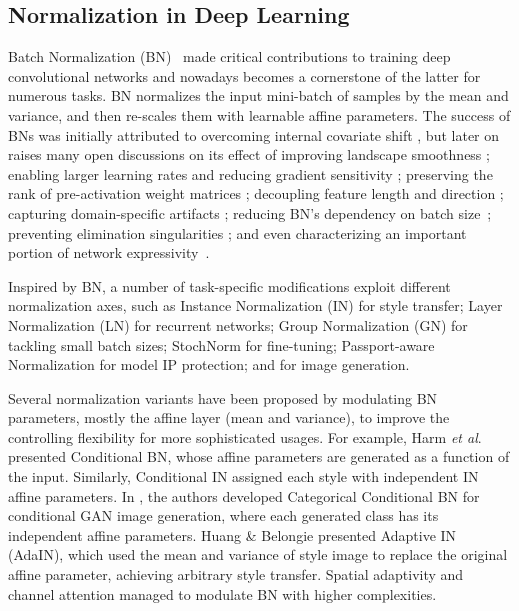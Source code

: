 \documentclass{article}
\newcommand{\etal}{\textit{et al}.}
\begin{document}
\subsection{Normalization in Deep Learning}
 Batch Normalization (BN)~\citep{ioffe2015batch} made critical contributions to training deep convolutional networks and nowadays becomes a cornerstone of the latter for numerous tasks. BN normalizes the input mini-batch of samples by the mean and variance, and then re-scales them with learnable affine parameters. The success of BNs was initially attributed to overcoming internal covariate shift \citep{ioffe2015batch}, but later on raises many open discussions on its effect of improving landscape smoothness \citep{santurkar2018does}; enabling larger learning rates \citep{bjorck2018understanding} and reducing gradient sensitivity \citep{arora2018theoretical}; preserving the rank of pre-activation weight matrices \citep{daneshmand2020theoretical}; decoupling feature length and direction \citep{kohler2018exponential}; capturing domain-specific artifacts \citep{li2016revisiting}; reducing BN's dependency on batch size~\cite{ioffe2017batch, singh2020filter}; preventing elimination singularities \cite{qiao2019rethinking}; and even characterizing an important portion of network expressivity~\citep{frankle2020training}.
 
 Inspired by BN, a number of task-specific modifications exploit different normalization axes, such as Instance Normalization (IN)  \citep{ulyanov2016instance} for style transfer; Layer Normalization (LN) \citep{ba2016layer} for recurrent networks;  Group Normalization (GN) \citep{wu2018group} for tackling small batch sizes;  StochNorm \cite{kou2020stochastic} for fine-tuning; Passport-aware Normalization \cite{zhang2020passport} for model IP protection; and \cite{li2019positional, wang2020attentive, zheng2020learning} for image generation.

Several normalization variants have been proposed by modulating BN parameters, mostly the affine layer (mean and variance), to improve the controlling flexibility for more sophisticated usages. For example, Harm \etal \citep{de2017modulating} presented Conditional BN, whose affine parameters are generated as a function of the input. Similarly, Conditional IN \citep{dumoulin2016learned} assigned each style with independent IN affine parameters. In \citep{miyato2018spectral}, the authors developed Categorical Conditional BN for conditional GAN image generation, where each generated class has its independent affine parameters. Huang \& Belongie \citep{huang2017arbitrary} presented Adaptive IN (AdaIN), which used the mean and variance of style image to replace the original affine parameter, achieving arbitrary style transfer. Spatial adaptivity \citep{park2019semantic} and channel attention \citep{li2019attentive} managed to modulate BN with higher complexities. 
\end{document}
